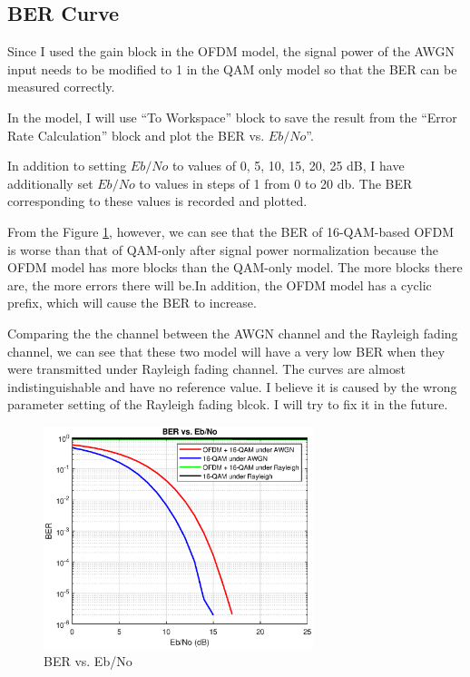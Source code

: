 \documentclass[10pt]{article}
\numberwithin{figure}{section}
\numberwithin{equation}{section}
\begin{document}
\subsection{BER Curve}
Since I used the gain block in the OFDM model, the signal power of the AWGN input needs to be modified to 1 in the QAM only model so that the BER can be measured correctly.

In the model, I will use ``To Workspace'' block to save the result from the ``Error Rate Calculation'' block and plot the BER vs. $Eb/No$''.

In addition to setting $Eb/No$ to values of 0, 5, 10, 15, 20, 25 dB, I have additionally set $Eb/No$ to values in steps of 1 from 0 to 20 db. The BER corresponding to these values is recorded and plotted.

From the Figure \ref{fig:BER}, however, we can see that the BER of 16-QAM-based OFDM is worse than that of QAM-only after signal power normalization because the OFDM model has more blocks than the QAM-only model. The more blocks there are, the more errors there will be.In addition, the OFDM model has a cyclic prefix, which will cause the BER to increase. 

Comparing the the channel between the AWGN channel and the Rayleigh fading channel, we can see that these two model will have a very low BER when they were transmitted under Rayleigh fading channel. The curves are almost indistinguishable and have no reference value. I believe it is caused by the wrong parameter setting of the Rayleigh fading blcok. I will try to fix it in the future.
\begin{figure}[!h]
    \centering
    \includegraphics[width=0.7\textwidth]{images/BER.eps}
    \caption{BER vs. Eb/No}
    \label{fig:BER}
\end{figure}
\end{document}
